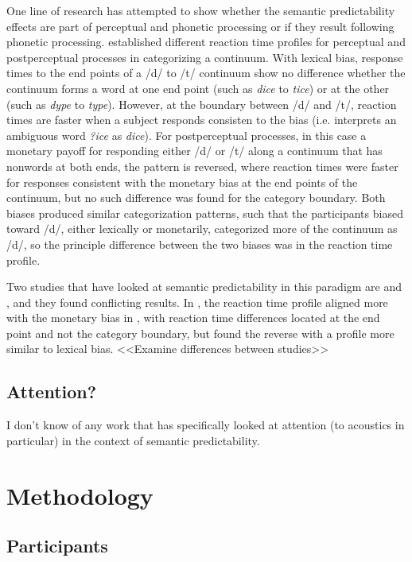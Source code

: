 One line of research has attempted to show whether the semantic predictability effects are part of perceptual and phonetic processing or if they result following phonetic processing.  \citet{ConnineClifton1987} established different reaction time profiles for perceptual and postperceptual processes in categorizing a continuum.  With lexical bias, response times to the end points of a /d/ to /t/ continuum show no difference whether the continuum forms a word at one end point (such as \emph{dice} to \emph{tice}) or at the other (such as \emph{dype} to \emph{type}).  However, at the boundary between /d/ and /t/, reaction times are faster when a subject responds consisten to the bias (i.e. interprets an ambiguous word \emph{?ice} as \emph{dice}).  For postperceptual processes, in this case a monetary payoff for responding either /d/ or /t/ along a continuum that has nonwords at both ends, the pattern is reversed, where reaction times were faster for responses consistent with the monetary bias at the end points of the continuum, but no such difference was found for the category boundary.  Both biases produced similar categorization patterns, such that the participants biased toward /d/, either lexically or monetarily, categorized more of the continuum as /d/, so the principle difference between the two biases was in the reaction time profile.

Two studies that have looked at semantic predictability in this paradigm are \citet{Connine1987} and \citet{BorskyEtAl1998}, and they found conflicting results.  In \citet{Connine1987}, the reaction time profile aligned more with the monetary bias in \citet{ConnineClifton1987}, with reaction time differences located at the end point and not the category boundary, but \citet{BorskyEtAl1998} found the reverse with a profile more similar to lexical bias.  <<Examine differences between studies>>

\subsection{Attention?}

I don't know of any work that has specifically looked at attention (to acoustics in particular) in the context of semantic predictability.

\section{Methodology}

\subsection{Participants}

